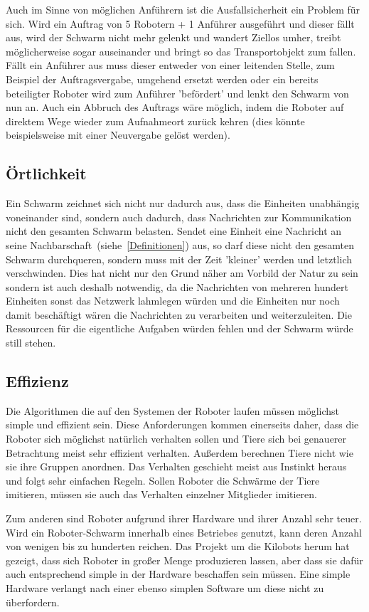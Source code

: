 Auch im Sinne von möglichen Anführern ist die Ausfallsicherheit ein Problem für sich. Wird ein Auftrag von 5 Robotern + 1 Anführer ausgeführt und dieser fällt aus, wird der Schwarm nicht mehr gelenkt und wandert Ziellos umher, treibt möglicherweise sogar auseinander und bringt so das Transportobjekt zum fallen. Fällt ein Anführer aus muss dieser entweder von einer leitenden Stelle, zum Beispiel der Auftragsvergabe, umgehend ersetzt werden oder ein bereits beteiligter Roboter wird zum Anführer 'befördert' und lenkt den Schwarm von nun an. Auch ein Abbruch des Auftrags wäre möglich, indem die Roboter auf direktem Wege wieder zum Aufnahmeort zurück kehren (dies könnte beispielsweise mit einer Neuvergabe gelöst werden).

\subsection*{Örtlichkeit}
Ein Schwarm zeichnet sich nicht nur dadurch aus, dass die Einheiten unabhängig voneinander sind, sondern auch dadurch, dass Nachrichten zur Kommunikation nicht den gesamten Schwarm belasten.
Sendet eine Einheit eine Nachricht an seine Nachbarschaft~(siehe~\autoref{Definitionen}) aus, so darf diese nicht den gesamten Schwarm durchqueren, sondern muss mit der Zeit 'kleiner' werden und letztlich verschwinden.
Dies hat nicht nur den Grund näher am Vorbild der Natur zu sein
sondern ist auch deshalb notwendig, da die Nachrichten von mehreren hundert Einheiten sonst das Netzwerk lahmlegen würden und die Einheiten nur noch damit beschäftigt wären die Nachrichten zu verarbeiten und weiterzuleiten.
Die Ressourcen für die eigentliche Aufgaben würden fehlen und der Schwarm würde still stehen.

\subsection*{Effizienz}
Die Algorithmen die auf den Systemen der Roboter laufen müssen möglichst simple und effizient sein. Diese Anforderungen kommen einerseits daher, dass die Roboter sich möglichst natürlich verhalten sollen und Tiere sich bei genauerer Betrachtung meist sehr effizient verhalten. Außerdem berechnen Tiere nicht wie sie ihre Gruppen anordnen. Das Verhalten geschieht meist aus Instinkt heraus und folgt sehr einfachen Regeln. Sollen Roboter die Schwärme der Tiere imitieren, müssen sie auch das Verhalten einzelner Mitglieder imitieren.

Zum anderen sind Roboter aufgrund ihrer Hardware und ihrer Anzahl sehr teuer. Wird ein Roboter-Schwarm innerhalb eines Betriebes genutzt, kann deren Anzahl von wenigen bis zu hunderten reichen. Das Projekt um die Kilobots herum\cite{Kilobot} hat gezeigt, dass sich Roboter in großer Menge produzieren lassen, aber dass sie dafür auch entsprechend simple in der Hardware beschaffen sein müssen. Eine simple Hardware verlangt nach einer ebenso simplen Software um diese nicht zu überfordern.







